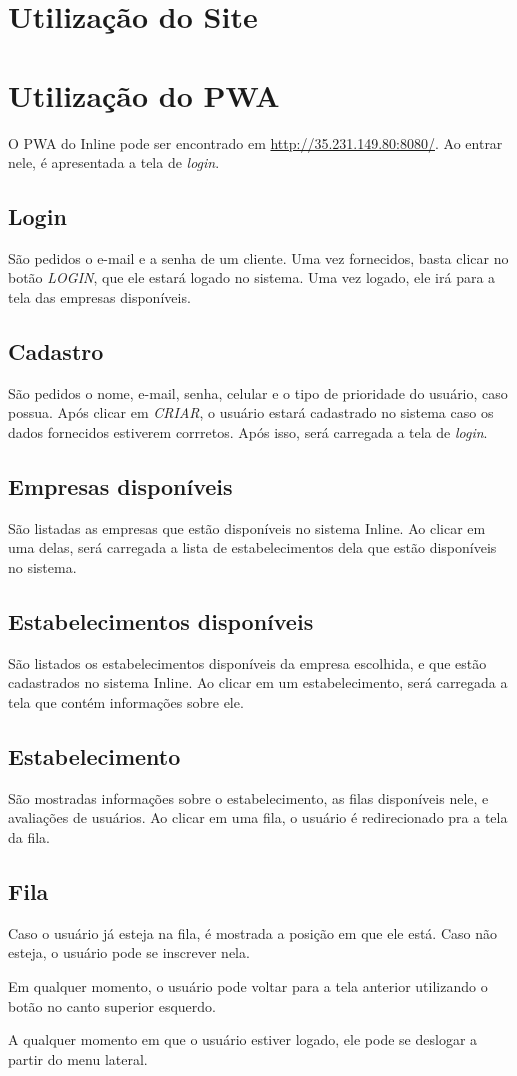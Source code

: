 \documentclass{book}
\begin{document}
\chapter{Utilização do Site}

\chapter{Utilização do PWA}

O PWA do Inline pode ser encontrado em \url{http://35.231.149.80:8080/}. Ao
entrar nele, é apresentada a tela de \textit{login}. 

\section{Login}

São pedidos o e-mail e a senha de um cliente. Uma vez fornecidos, basta clicar
no botão \textit{LOGIN}, que ele estará logado no sistema. Uma vez logado, ele
irá para a tela das empresas disponíveis.

\section{Cadastro}
São pedidos o nome, e-mail, senha, celular e o tipo de prioridade do usuário,
caso possua. Após clicar em \textit{CRIAR}, o usuário estará cadastrado no
sistema caso os dados fornecidos estiverem corrretos. Após isso, será carregada
a tela de \textit{login}.

\section{Empresas disponíveis}
São listadas as empresas que estão disponíveis no sistema Inline. Ao clicar em
uma delas, será carregada a lista de estabelecimentos dela que estão disponíveis
no sistema.

\section{Estabelecimentos disponíveis}
São listados os estabelecimentos disponíveis da empresa escolhida, e que estão
cadastrados no sistema Inline. Ao clicar em um estabelecimento, será carregada a
tela que contém informações sobre ele.

\section{Estabelecimento}
São mostradas informações sobre o estabelecimento, as filas disponíveis nele, e
avaliações de usuários. Ao clicar em uma fila, o usuário é redirecionado pra a
tela da fila.

\section{Fila}
Caso o usuário já esteja na fila, é mostrada a posição em que ele está. Caso não
esteja, o usuário pode se inscrever nela.

Em qualquer momento, o usuário pode voltar para a tela anterior utilizando o
botão no canto superior esquerdo.

A qualquer momento em que o usuário estiver logado, ele pode se deslogar a
partir do menu lateral.
\end{document}
